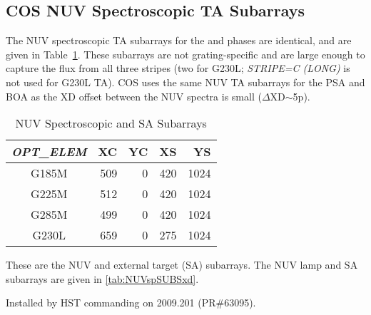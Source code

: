 \subsection{COS NUV Spectroscopic TA Subarrays}\label{subsec:NUVspSUBS}
The NUV spectroscopic TA subarrays for the  and  phases are identical, and are given in Table~\ref{tab:NUVspSUBSsad}.
These subarrays are not grating-specific and are large enough to capture the flux from all three stripes (two for G230L; \textit{STRIPE=C (LONG)} is not used for G230L TA).
COS uses the same NUV TA subarrays for the PSA and BOA as the XD offset between the NUV spectra is small ($\Delta$XD$\sim$5p).
\begin{table}
\centering
	\begin{threeparttable}[tbc]
		\caption[NUV Spectroscopic  and  SA Subarrays]{NUV Spectroscopic  and  SA Subarrays}
		\begin{tabular*}{.7\linewidth}{@{\extracolsep{\fill}}|c|rrrr|}
			\hline
			\textit{OPT\_ELEM}& XC & YC & XS & YS \\
			\hline
			G185M&509&0&420&1024\\
			G225M&512&0&420&1024\\
			G285M&499&0&420&1024\\
			G230L&659&0&275&1024\\
			\hline
		\end{tabular*}
		\footnotesize
		\begin{tablenotes}[para]
			\item [1] These are the NUV  and  external target (SA) subarrays.
			 The NUV  lamp and SA subarrays are given in \ref{tab:NUVspSUBSxd}.
			\item [2] Installed by HST commanding on 2009.201 (PR\#63095).
		   \end{tablenotes}
		\label{tab:NUVspSUBSsad}
		\normalsize
	\end{threeparttable}
\end{table}

